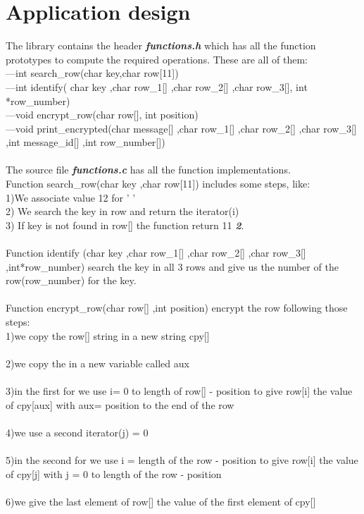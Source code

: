 \documentclass[14pt]{article}
\begin{document}
\newpage
\section*{Application design}
\vspace{10 mm}
The library contains the header \textbf{\textit{functions.h}} which has all the function prototypes to compute the required operations. These are all of them:
\\---int search\_row(char key,char row[11])
\\---int identify( char key ,char row\_1[] ,char row\_2[] ,char row\_3[], int *row\_number)
\\---void encrypt\_row(char row[], int position)
\\---void print\_encrypted(char message[] ,char row\_1[] ,char row\_2[] ,char row\_3[] ,int message\_id[] ,int row\_number[])
\\\vspace{3 mm}
\\The source file \textbf{\textit{functions.c}} has all the function implementations.
\\Function search\_row(char key ,char row[11]) includes some steps, like:
\\1)We associate value 12 for ' '\\
2) We search the key in row and return the iterator(i) 
\\3) If key is not found in row[] the function return 11 \textbf{\textit{2}}.
\\\vspace{2 mm}
\\Function identify (char key ,char row\_1[] ,char row\_2[] ,char row\_3[] ,int*row\_number) search the key in all 3 rows and give us the number of the row(row\_number) for the key. 
\\\vspace{3 mm}
\\Function encrypt\_row(char row[] ,int position) encrypt the row following those steps:
\\1)we copy the row[] string in a new string cpy[]\\
\\2)we copy the in a new variable called aux\\
\\3)in the first for we use i= 0 to length of row[] - position to give row[i] the value of cpy[aux] with aux= position to the end of the row \\
\\4)we use a second iterator(j) = 0\\
\\5)in the second for  we use i = length of the row - position to give row[i] the value of cpy[j] with j = 0 to length of the row - position\\
\\6)we give the last element of row[] the value of the first element of cpy[]\\
\\\vspace{2 mm}
\end{document}
